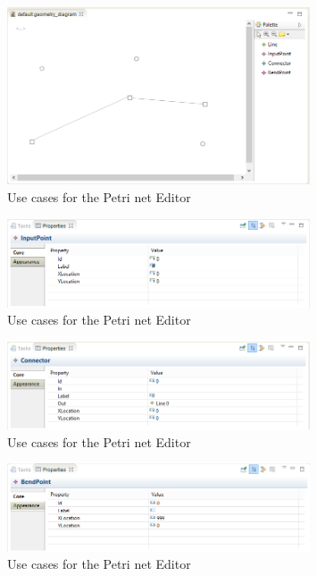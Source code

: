 \begin{figure}[htp]
\begin{center}
  \includegraphics[width=0.8\textwidth]{image/geometry3.png}
  \caption{Use cases for the Petri net Editor}
  \label{fig:geometry3}
\end{center}
\end{figure}

\begin{figure}[htp]
\begin{center}
  \includegraphics[width=0.8\textwidth]{image/geometry4.png}
  \caption{Use cases for the Petri net Editor}
  \label{fig:geometry4}
\end{center}
\end{figure}

\begin{figure}[htp]
\begin{center}
  \includegraphics[width=0.8\textwidth]{image/geometry5.png}
  \caption{Use cases for the Petri net Editor}
  \label{fig:geometry5}
\end{center}
\end{figure}

\begin{figure}[htp]
\begin{center}
  \includegraphics[width=0.8\textwidth]{image/geometry6.png}
  \caption{Use cases for the Petri net Editor}
  \label{fig:geometry6}
\end{center}
\end{figure}

